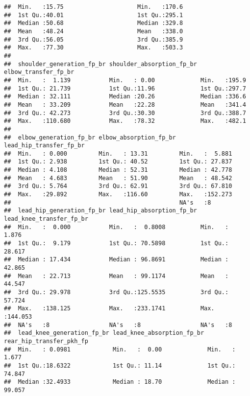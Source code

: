 \documentclass[
]{article}
\begin{document}
\begin{verbatim}
##  Min.   :15.75                     Min.   :170.6          
##  1st Qu.:40.01                     1st Qu.:295.1          
##  Median :50.68                     Median :329.8          
##  Mean   :48.24                     Mean   :338.0          
##  3rd Qu.:56.05                     3rd Qu.:385.9          
##  Max.   :77.30                     Max.   :503.3          
##                                                           
##  shoulder_generation_fp_br shoulder_absorption_fp_br elbow_transfer_fp_br
##  Min.   :  1.139           Min.   : 0.00             Min.   :195.9       
##  1st Qu.: 21.739           1st Qu.:11.96             1st Qu.:297.7       
##  Median : 32.111           Median :20.26             Median :336.6       
##  Mean   : 33.209           Mean   :22.28             Mean   :341.4       
##  3rd Qu.: 42.273           3rd Qu.:30.30             3rd Qu.:388.7       
##  Max.   :110.680           Max.   :78.32             Max.   :482.1       
##                                                                          
##  elbow_generation_fp_br elbow_absorption_fp_br lead_hip_transfer_fp_br
##  Min.   : 0.000         Min.   : 13.31         Min.   :  5.881        
##  1st Qu.: 2.938         1st Qu.: 40.52         1st Qu.: 27.837        
##  Median : 4.108         Median : 52.31         Median : 42.778        
##  Mean   : 4.683         Mean   : 51.90         Mean   : 48.542        
##  3rd Qu.: 5.764         3rd Qu.: 62.91         3rd Qu.: 67.810        
##  Max.   :29.892         Max.   :116.60         Max.   :152.273        
##                                                NA's   :8              
##  lead_hip_generation_fp_br lead_hip_absorption_fp_br lead_knee_transfer_fp_br
##  Min.   :  0.000           Min.   :  0.8008          Min.   :  1.876         
##  1st Qu.:  9.179           1st Qu.: 70.5898          1st Qu.: 28.617         
##  Median : 17.434           Median : 96.8691          Median : 42.865         
##  Mean   : 22.713           Mean   : 99.1174          Mean   : 44.547         
##  3rd Qu.: 29.978           3rd Qu.:125.5535          3rd Qu.: 57.724         
##  Max.   :138.125           Max.   :233.1741          Max.   :144.053         
##  NA's   :8                 NA's   :8                 NA's   :8               
##  lead_knee_generation_fp_br lead_knee_absorption_fp_br rear_hip_transfer_pkh_fp
##  Min.   : 0.0981            Min.   :  0.00             Min.   :  1.677         
##  1st Qu.:18.6322            1st Qu.: 11.14             1st Qu.: 74.847         
##  Median :32.4933            Median : 18.70             Median : 99.057         

\end{verbatim}
\end{document}
